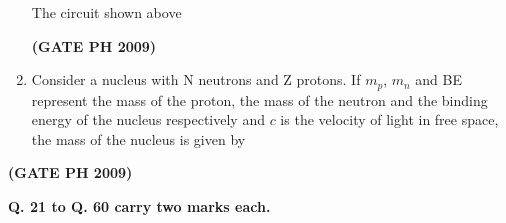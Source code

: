 \documentclass[14pt, a4paper]{extarticle}
\begin{document}
\begin{enumerate}[label=\textbf{Q. \arabic*}]
The circuit shown above
\begin{enumerate}
\end{enumerate}
\hfill \textbf{(GATE PH 2009)}

\item Consider a nucleus with N neutrons and Z protons. If $m_p$, $m_n$ and BE represent the mass of the proton, the mass of the neutron and the binding energy of the nucleus respectively and $c$ is the velocity of light in free space, the mass of the nucleus is given by
    \begin{enumerate}
    \end{enumerate}
\end{enumerate}
\hfill \textbf{(GATE PH 2009)}

\vspace{1.5em}
\noindent 
\textbf{Q. 21 to Q. 60 carry two marks each.}
\vspace{1em}
\end{document}

